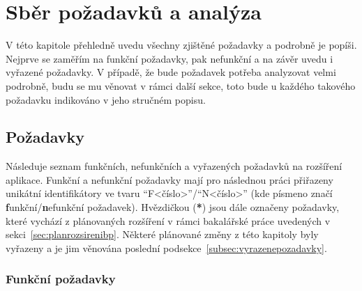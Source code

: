 \chapter{Sběr požadavků a analýza}\label{chap:sberpozadavkuaanalyza}

V této kapitole přehledně uvedu všechny zjištěné požadavky a podrobně je popíši. Nejprve se zaměřím na funkční požadavky, pak nefunkční a na závěr uvedu i vyřazené požadavky. V případě, že bude požadavek potřeba analyzovat velmi podrobně, budu se mu věnovat v rámci další sekce, toto bude u každého takového požadavku indikováno v jeho stručném popisu.

\section{Požadavky}

Následuje seznam funkčních, nefunkčních a vyřazených požadavků na rozšíření aplikace. Funkční a nefunkční požadavky mají pro následnou práci přiřazeny unikátní identifikátory ve tvaru \enquote{F<číslo>}/\enquote{N<číslo>} (kde písmeno značí \textbf{f}unkční/\textbf{n}efunkční požadavek). Hvězdičkou (\textbf{*}) jsou dále označeny požadavky, které vychází z plánovaných rozšíření v rámci bakalářské práce uvedených v sekci~\ref{sec:planrozsirenibp}. Některé plánované změny z této kapitoly byly vyřazeny a je jim věnována poslední podsekce~\ref{subsec:vyrazenepozadavky}.

\subsection{Funkční požadavky}

